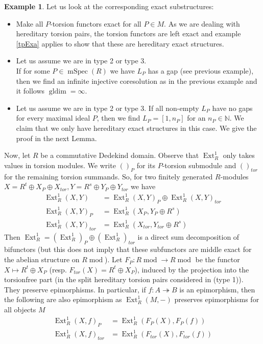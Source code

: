 \documentclass[11pt,a4paper]{amsart}
\theoremstyle{plain}
\theoremstyle{definition}
\newtheorem{exa}[thm]{Example}
\DeclareMathOperator{\Ext}{Ext}
\DeclareMathOperator{\modu}{mod}
\DeclareMathOperator{\gldim}{gldim}
\newcommand{\defl}{\twoheadrightarrow}
\DeclareMathOperator{\mSpec}{mSpec}
\begin{document}
\begin{exa}
Let us look at the corresponding exact substructures: 
\begin{itemize}
\item[(type 1)] 
Make all $P$-torsion functors exact for all $P\in M$. As we are dealing with hereditary torsion pairs, the torsion functors are left exact and example \ref{tpExa} applies to show that these are hereditary exact structures. 
\item[(gaps)]
Let us assume we are in type 2 or type 3.\\
If for some $P\in \mSpec (R)$ we have $L_P$ has a gap (see previous example), then we find an infinite injective coresolution as in the previous example and it follows $\gldim = \infty$.   
\item[(no gaps)]
Let us assume we are in type 2 or type 3. If all non-empty $L_P$ have no gaps for every maximal ideal $P$, then we find $L_P=[1, n_P]$ for an $n_P\in \mathbb{N}$. We claim that we only have hereditary exact structures in this case. We give the proof in the next Lemma.

\end{itemize}
\end{exa}

Now, let $R$ be a commutative Dedekind domain. Observe that $\Ext^1_R$ only takes values in torsion modules. We write $()_P$ for its $P$-torsion submodule and $()_{tor}$ for the remaining torsion summands. So, for two finitely generated $R$-modules $X=R^t\oplus X_P \oplus X_{tor},Y=R^s\oplus Y_P \oplus Y_{tor}$ we have 
\[
\begin{aligned}
\Ext^1_R(X,Y) &=\Ext^1_R(X,Y)_P\oplus \Ext^1_R(X,Y)_{tor}\\
\Ext^1_R(X, Y)_P &= \Ext^1_R(X_P, Y_P\oplus R^s)\\
\Ext^1_R(X,Y)_{tor} &=\Ext^1_R (X_{tor}, Y_{tor}\oplus R^s)
\end{aligned}
\]
Then $\Ext^1_R = (\Ext^1_R)_P\oplus (\Ext^1_R)_{tor}$ is a direct sum decomposition of bifunctors (but this does not imply that these subfunctors are middle exact for the abelian structure on $R\modu$). Let $F_P\colon R\modu\to R\modu$ be the functor $X\mapsto R^t \oplus X_P$ (resp. $F_{tor}(X)=R^t\oplus X_P$), induced by the projection into the torsionfree part (in the split hereditary torsion pairs considered in (type 1)). They preserve epimorphisms. In particular, if $f\colon A\defl B$ is an epimorphism, then the following are also epimorphism as $\Ext^1_R(M,-)$ preserves epimorphisms for all objects $M$ 
\[
\begin{aligned}
\Ext^1_R(X, f)_P &=\Ext^1_R(F_P(X), F_P(f))\\
\Ext^1_R(X,f)_{tor} &= \Ext^1_R(F_{tor}(X), F_{tor} (f))
\end{aligned}
\]
\end{document}
